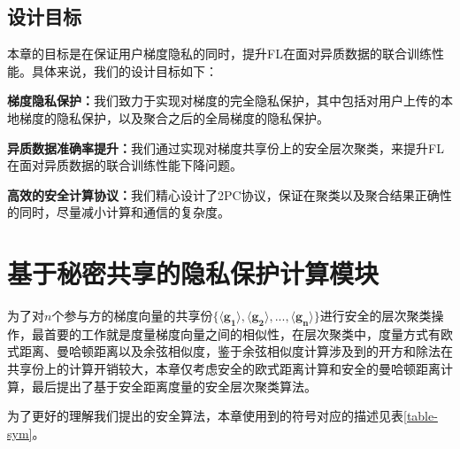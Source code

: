 \subsection{设计目标}
本章的目标是在保证用户梯度隐私的同时，提升FL在面对异质数据的联合训练性能。具体来说，我们的设计目标如下：
\begin{compactitem}
    \item \textbf{梯度隐私保护：}我们致力于实现对梯度的完全隐私保护，其中包括对用户上传的本地梯度的隐私保护，以及聚合之后的全局梯度的隐私保护。
    \item \textbf{异质数据准确率提升：}我们通过实现对梯度共享份上的安全层次聚类，来提升FL在面对异质数据的联合训练性能下降问题。
    \item \textbf{高效的安全计算协议：}我们精心设计了2PC协议，保证在聚类以及聚合结果正确性的同时，尽量减小计算和通信的复杂度。
\end{compactitem}

\section{基于秘密共享的隐私保护计算模块}\label{4-building}
为了对$n$个参与方的梯度向量的共享份$\{\boldsymbol{\langle g_1\rangle}, \boldsymbol{\langle g_2\rangle},...,\boldsymbol{\langle g_n\rangle} \}$进行安全的层次聚类操作，最首要的工作就是度量梯度向量之间的相似性，在层次聚类中，度量方式有欧式距离、曼哈顿距离以及余弦相似度，鉴于余弦相似度计算涉及到的开方和除法在共享份上的计算开销较大，本章仅考虑安全的欧式距离计算和安全的曼哈顿距离计算，最后提出了基于安全距离度量的安全层次聚类算法。

为了更好的理解我们提出的安全算法，本章使用到的符号对应的描述见表\ref{table-sym}。

\begin{table}
	\centering
	\caption{符号说明}
	\label{table-sym}
\end{table}

